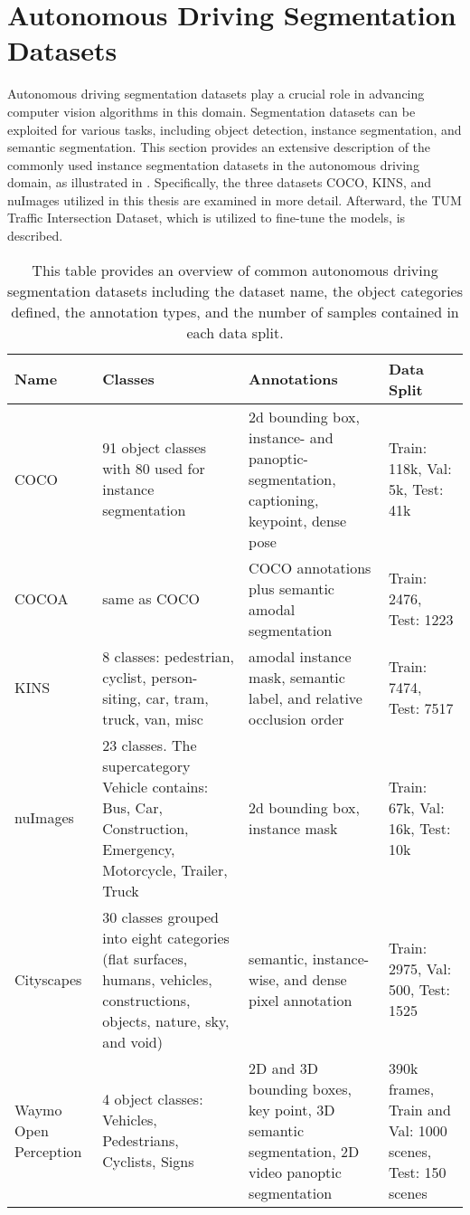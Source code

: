 \section{Autonomous Driving Segmentation Datasets} \label{section:segmentation_dataset}
Autonomous driving segmentation datasets play a crucial role in advancing computer vision algorithms in this domain. Segmentation datasets can be exploited for various tasks, including object detection, instance segmentation, and semantic segmentation. This section provides an extensive description of the commonly used instance segmentation datasets in the autonomous driving domain, as illustrated in . Specifically, the three datasets COCO, KINS, and nuImages utilized in this thesis are examined in more detail. Afterward, the TUM Traffic Intersection Dataset, which is utilized to fine-tune the models, is described. 

\begin{table}[htb]
	\centering
	\scriptsize
	\begin{tabular}{p{1.3cm}p{5cm}p{4.5cm}p{2.6cm}}
		\hline
		\textbf{Name} & \textbf{Classes} & \textbf{Annotations} & \textbf{Data Split}\\
		\hline \raggedright
		COCO & 91 object classes with 80 used for instance segmentation & 2d bounding box, instance- and panoptic- segmentation, captioning, keypoint, dense pose & Train: 118k, Val: 5k, Test: 41k \\
		\hline 
		COCOA & same as COCO & COCO annotations plus semantic amodal segmentation & Train: 2476, Test: 1223 \\
		\hline
		KINS & 8 classes: pedestrian, cyclist, person-siting, car, tram, truck, van, misc & amodal instance mask, semantic label, and relative occlusion order & Train: 7474, Test: 7517 \\
		\hline
		nuImages & 23 classes. The supercategory Vehicle contains: Bus, Car, Construction, Emergency, Motorcycle, Trailer, Truck & 2d bounding box, instance mask & Train: 67k, Val: 16k, Test: 10k \\
		\hline
		Cityscapes \cite{cityscapes} & 30 classes grouped into eight categories (flat surfaces, humans, vehicles, constructions, objects, nature, sky, and void) & semantic, instance-wise, and dense pixel annotation & Train: 2975, Val: 500, Test: 1525 \\
		\hline
		Waymo Open Perception \cite{waymoOpenDataset} & 4 object classes: Vehicles, Pedestrians, Cyclists, Signs & 2D and 3D bounding boxes, key point, 3D semantic segmentation, 2D video panoptic segmentation & 390k frames, Train and Val: 1000 scenes, Test: 150 scenes \\
		\hline
	\end{tabular}
	\caption{This table provides an overview of common autonomous driving segmentation datasets including the dataset name, the object categories defined, the annotation types, and the number of samples contained in each data split.}
	\label{tab:segmentation_datasets}
\end{table}

